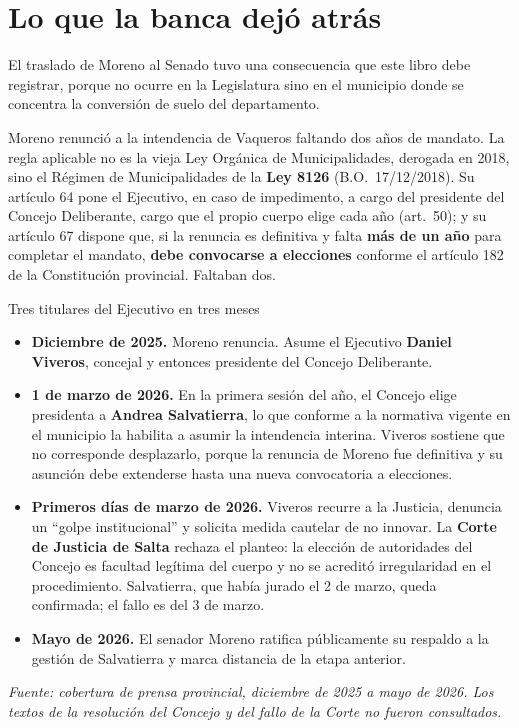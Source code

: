 \section{Lo que la banca dejó atrás}

El traslado de Moreno al Senado tuvo una consecuencia que este libro debe registrar, porque no ocurre en la Legislatura sino en el municipio donde se concentra la conversión de suelo del departamento.

Moreno renunció a la intendencia de Vaqueros faltando dos años de mandato. La regla aplicable no es la vieja Ley Orgánica de Municipalidades, derogada en 2018, sino el Régimen de Municipalidades de la \textbf{Ley 8126} (B.O.\ 17/12/2018). Su artículo 64 pone el Ejecutivo, en caso de impedimento, a cargo del presidente del Concejo Deliberante, cargo que el propio cuerpo elige cada año (art.\ 50); y su artículo 67 dispone que, si la renuncia es definitiva y falta \textbf{más de un año} para completar el mandato, \textbf{debe convocarse a elecciones} conforme el artículo 182 de la Constitución provincial. Faltaban dos. 

\begin{ficha}{Tres titulares del Ejecutivo en tres meses}
\begin{itemize}[leftmargin=*,nosep]
\item \textbf{Diciembre de 2025.} Moreno renuncia. Asume el Ejecutivo \textbf{Daniel Viveros}, concejal y entonces presidente del Concejo Deliberante.
\item \textbf{1 de marzo de 2026.} En la primera sesión del año, el Concejo elige presidenta a \textbf{Andrea Salvatierra}, lo que conforme a la normativa vigente en el municipio la habilita a asumir la intendencia interina. Viveros sostiene que no corresponde desplazarlo, porque la renuncia de Moreno fue definitiva y su asunción debe extenderse hasta una nueva convocatoria a elecciones.
\item \textbf{Primeros días de marzo de 2026.} Viveros recurre a la Justicia, denuncia un ``golpe institucional'' y solicita medida cautelar de no innovar. La \textbf{Corte de Justicia de Salta} rechaza el planteo: la elección de autoridades del Concejo es facultad legítima del cuerpo y no se acreditó irregularidad en el procedimiento. Salvatierra, que había jurado el 2 de marzo, queda confirmada; el fallo es del 3 de marzo.
\item \textbf{Mayo de 2026.} El senador Moreno ratifica públicamente su respaldo a la gestión de Salvatierra y marca distancia de la etapa anterior.
\end{itemize}
\textit{Fuente: cobertura de prensa provincial, diciembre de 2025 a mayo de 2026. Los textos de la resolución del Concejo y del fallo de la Corte no fueron consultados.}
\end{ficha}


